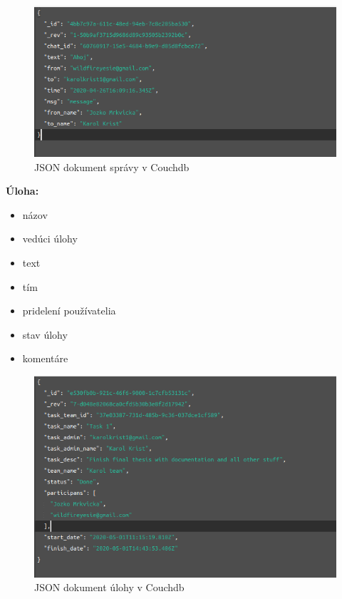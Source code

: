 \begin{figure}[H]
    \centering
    \includegraphics[scale=0.50]{img/imp/db_message.png}
    \caption{JSON dokument správy v Couchdb}
    \label{fig:db_message}
\end{figure}

\textbf{Úloha:}
\indent\begin{itemize}
    \item názov
    \item vedúci úlohy
    \item text
    \item tím
    \item pridelení používatelia
    \item stav úlohy
    \item komentáre
\end{itemize}

\begin{figure}[H]
    \centering
    \includegraphics[scale=0.50]{img/imp/db_task.png}
    \caption{JSON dokument úlohy v Couchdb}
    \label{fig:db_task}
\end{figure}


